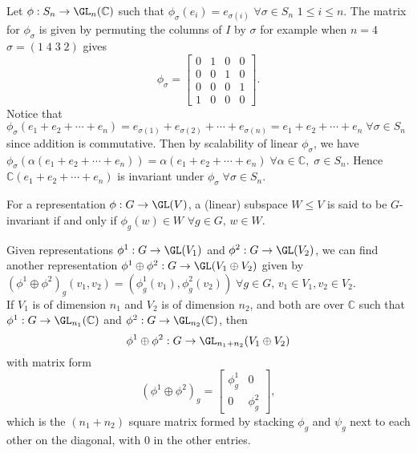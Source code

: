 \begin{exam}
	Let $\phi : S_n \to \GL_n(\mathbb{C})$ such that $\phi_\sigma(e_i) = e_{\sigma(i)}$ $\forall \sigma \in S_n$\; $1 \leqslant i \leqslant n$. The matrix for $\phi_\sigma$ is given by permuting the columns of $I$ by $\sigma$\; for example when $n = 4$\; $\sigma = (1\;4\;3\;2)$ gives
	$$\phi_\sigma = \begin{bmatrix} 0 & 1 & 0 & 0 \\
									0 & 0 & 1 & 0\\
									0 & 0 & 0 & 1\\
									1 & 0 & 0 & 0\end{bmatrix}.$$
	Notice that $\phi_{\sigma}(e_1 + e_2 + \cdots + e_n) = e_{\sigma(1)} + e_{\sigma(2)} + \cdots + e_{\sigma(n)} = e_1 + e_2 + \cdots + e_n\; \forall \sigma \in S_n$ since addition is commutative. Then by scalability of linear $\phi_\sigma$, we have $\phi_\sigma(\alpha(e_1 + e_2 + \cdots + e_n)) = \alpha(e_1 + e_2 + \cdots + e_n)\; \forall \alpha \in \mathbb{C},\;\sigma \in S_n$. Hence $\mathbb{C}(e_1 + e_2 + \cdots + e_n)$ is invariant under $\phi_\sigma\;\forall \sigma \in S_n$.
\end{exam}

\begin{defi}
	For a representation $\phi : G \to \GL(V)$, a (linear) subspace $W \leqslant V$ is said to be $G$-invariant if and only if $\phi_g(w) \in W$ $\forall g \in G,\, w \in W$.
\end{defi}

\begin{defi}
	Given representations $\phi^1 : G \to \GL(V_1)$ and $\phi^2 : G \to \GL(V_2)$, we can find another representation $\phi^1 \oplus \phi^2 : G \to \GL(V_1 \oplus V_2)$ given by $(\phi^1 \oplus \phi^2)_g(v_1,v_2) = (\phi^1_g(v_1),\phi^2_g(v_2))\;\forall g\in G,\,v_1 \in V_1, v_2 \in V_2$.\\

	If $V_1$ is of dimension $n_1$ and $V_2$ is of dimension $n_2$, and both are over $\mathbb{C}$ such that $\phi^1 : G \to \GL_{n_1}(\mathbb{C})$ and $\phi^2 : G \to \GL_{n_2}(\mathbb{C})$, then
	$$\phi^1 \oplus \phi^2 : G \to \GL_{n_1 + n_2}(V_1 \oplus V_2)$$
	with matrix form
	$$ (\phi^1 \oplus \phi^2)_g =
	\begin{bmatrix}
		\phi^1_g & 0\\ 0 & \phi^2_g	
	\end{bmatrix},$$
	which is the $(n_1 + n_2)$ square matrix formed by stacking $\phi_g$ and $\psi_g$ next to each other on the diagonal, with $0$ in the other entries.
\end{defi}

